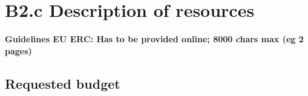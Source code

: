 \documentclass[11pt,a4paper]{report}
\newcommand{\eu}[1]{{\color{teal}\textbf{Guidelines EU ERC: #1}}}
\begin{document}


\newpage
\printbibliography

\newrefsection
\newpage
\chapter{B2.c Description of resources}

\eu{Has to be provided online; 8000 chars max (eg 2 pages)}


\section{Requested budget}
\end{document}
